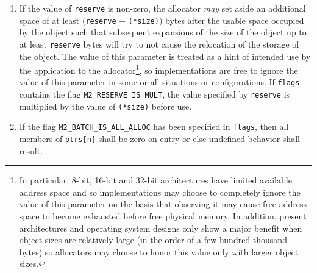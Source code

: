 \documentclass[wd]{isov2}
\begin{document}
{\begin{enumerate}
\begin{enumerate}
If the modification is successful and if \texttt{errnos} is not NULL, then \texttt{errnos[n]} is also set to zero. If the modification is not successful and if \texttt{errnos} is not NULL, then \texttt{errnos[n]} is set to one of:
\begin{enumerate}
\renewcommand{\theenumii}{\alph{enumii}}
\item \texttt{ENOMEM} in the situation that the system has insufficient free memory to satisfy the expansion of the size of the object.
\item \texttt{ENOSPC} in the situation that the flag \texttt{M2\_PREVENT\_MOVE} was specified and there is insufficient free space existing after the existing object to satisfy the expansion of the size of the object or the alignment of the existing object is not sufficient to match \texttt{alignment}.
\item Otherwise, an implementation-dependent value conforming with the requirements of Section 7.5 (Errors \texttt{<errno.h>}).
\end{enumerate}
\end{enumerate}
\item If the value of \texttt{reserve} is non-zero, the allocator \emph{may} set aside an additional space of at least $($\texttt{reserve} $-$ \texttt{(*size)}$)$ bytes after the usable space occupied by the object such that subsequent expansions of the size of the object up to at least \texttt{reserve} bytes will try to not cause the relocation of the storage of the object. The value of this parameter is treated as a hint of intended use by the application to the allocator\footnote{In particular, 8-bit, 16-bit and 32-bit architectures have limited available address space and so implementations may choose to completely ignore the value of this parameter on the basis that observing it may cause free address space to become exhausted before free physical memory. In addition, present architectures and operating system designs only show a major benefit when object sizes are relatively large (in the order of a few hundred thousand bytes) so allocators may choose to honor this value only with larger object sizes.}, so implementations are free to ignore the value of this parameter in some or all situations or configurations. If \texttt{flags} contains the flag \texttt{M2\_RESERVE\_IS\_MULT}, the value specified by \texttt{reserve} is multiplied by the value of \texttt{(*size)} before use.
\item If the flag \texttt{M2\_BATCH\_IS\_ALL\_ALLOC} has been specified in \texttt{flags}, then all members of \texttt{ptrs[n]} shall be zero on entry or else undefined behavior shall result.

\end{enumerate}}
\end{document}
